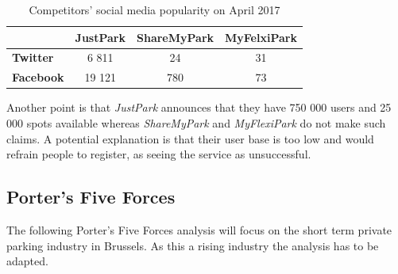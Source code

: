 \documentclass[12pt,a4paper,oneside]{book}
\begin{document}
\begin{table}[h]
\centering
\caption{Competitors' social media popularity on April 2017}
\label{smp}
\begin{tabular}{@{}lccc@{}}
\toprule
\textbf{}         & JustPark & ShareMyPark & MyFelxiPark \\ \midrule
\textbf{Twitter}  & 6 811    & 24          & 31          \\ \midrule
\textbf{Facebook} & 19 121   & 780         & 73          \\ \bottomrule
\end{tabular}
\end{table}

Another point is that \textit{JustPark} announces that they have 750 000 users\cite{jpu} and 25 000 spots available\cite{jpd} whereas \textit{ShareMyPark} and \textit{MyFlexiPark} do not make such claims. A potential explanation is that their user base is too low and would refrain people to register, as seeing the service as unsuccessful.



\subsection{Porter’s Five Forces}
The following Porter's Five Forces analysis will focus on the short term private parking industry in Brussels. As this a rising industry the analysis has to be adapted.\\
\end{document}
